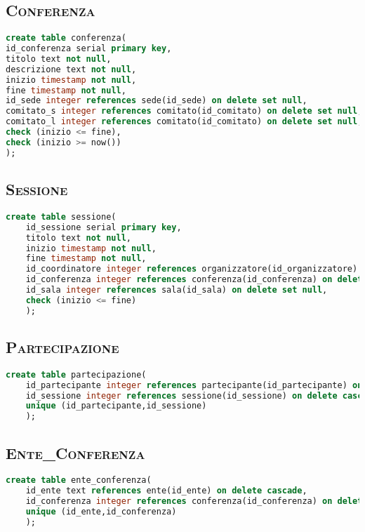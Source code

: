 \subsection{\textsc{Conferenza}}
\begin{lstlisting}[language=SQL,style=mystyle]
create table conferenza(
id_conferenza serial primary key,
titolo text not null,
descrizione text not null,
inizio timestamp not null,
fine timestamp not null,
id_sede integer references sede(id_sede) on delete set null,
comitato_s integer references comitato(id_comitato) on delete set null,
comitato_l integer references comitato(id_comitato) on delete set null,
check (inizio <= fine), 
check (inizio >= now()) 
);
\end{lstlisting}
\subsection{\textsc{Sessione}}
\begin{lstlisting}[language=SQL,style=mystyle]
	create table sessione(
	id_sessione serial primary key,
	titolo text not null,
	inizio timestamp not null,
	fine timestamp not null,
	id_coordinatore integer references organizzatore(id_organizzatore) on delete set null,
	id_conferenza integer references conferenza(id_conferenza) on delete cascade,
	id_sala integer references sala(id_sala) on delete set null,
	check (inizio <= fine)
	);
\end{lstlisting}
\subsection{\textsc{Partecipazione}}
\begin{lstlisting}[language=SQL,style=mystyle]
	create table partecipazione(
	id_partecipante integer references partecipante(id_partecipante) on delete cascade,
	id_sessione integer references sessione(id_sessione) on delete cascade,
	unique (id_partecipante,id_sessione) 
	);
\end{lstlisting}
\subsection{\textsc{Ente\_Conferenza}}
\begin{lstlisting}[language=SQL,style=mystyle]
	create table ente_conferenza(
	id_ente text references ente(id_ente) on delete cascade,
	id_conferenza integer references conferenza(id_conferenza) on delete cascade,
	unique (id_ente,id_conferenza)
	);
\end{lstlisting}
